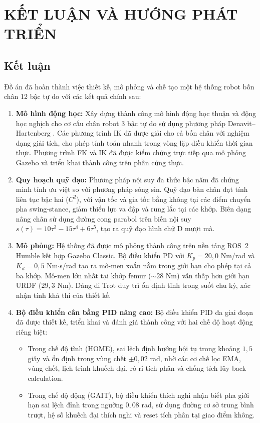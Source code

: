 \chapter{KẾT LUẬN VÀ HƯỚNG PHÁT TRIỂN}

\section{Kết luận}

Đồ án đã hoàn thành việc thiết kế, mô phỏng và chế tạo một hệ thống robot bốn chân 12 bậc tự do với các kết quả chính sau:

\begin{enumerate}
    \item \textbf{Mô hình động học:} Xây dựng thành công mô hình động học thuận và động học nghịch cho cơ cấu chân robot 3 bậc tự do sử dụng phương pháp Denavit--Hartenberg \cite{denavit1955}. Các phương trình IK đã được giải cho cả bốn chân với nghiệm dạng giải tích, cho phép tính toán nhanh trong vòng lặp điều khiển thời gian thực. Phương trình FK và IK đã được kiểm chứng trực tiếp qua mô phỏng Gazebo và triển khai thành công trên phần cứng thực.

    \item \textbf{Quy hoạch quỹ đạo:} Phương pháp nội suy đa thức bậc năm đã chứng minh tính ưu việt so với phương pháp sóng sin. Quỹ đạo bàn chân đạt tính liên tục bậc hai ($C^2$), với vận tốc và gia tốc bằng không tại các điểm chuyển pha swing-stance, giảm thiểu lực va đập và rung lắc tại các khớp. Biên dạng nâng chân sử dụng đường cong parabol trên biến nội suy $s(\tau) = 10\tau^3 - 15\tau^4 + 6\tau^5$, tạo ra quỹ đạo hình chữ D mượt mà.

    \item \textbf{Mô phỏng:} Hệ thống đã được mô phỏng thành công trên nền tảng ROS~2 Humble kết hợp Gazebo Classic. Bộ điều khiển PD với $K_p = 20{,}0$ Nm/rad và $K_d = 0{,}5$ Nm$\cdot$s/rad tạo ra mô-men xoắn nằm trong giới hạn cho phép tại cả ba khớp. Mô-men lớn nhất tại khớp femur ($\sim 28$ Nm) vẫn thấp hơn giới hạn URDF ($29{,}3$ Nm). Dáng đi Trot duy trì ổn định tĩnh trong suốt chu kỳ, xác nhận tính khả thi của thiết kế.

    \item \textbf{Bộ điều khiển cân bằng PID nâng cao:} Bộ điều khiển PID đa giai đoạn đã được thiết kế, triển khai và đánh giá thành công với hai chế độ hoạt động riêng biệt:
    \begin{itemize}
        \item Trong chế độ tĩnh (HOME), sai lệch định hướng hội tụ trong khoảng $1{,}5$ giây và ổn định trong vùng chết $\pm 0{,}02$ rad, nhờ các cơ chế lọc EMA, vùng chết, lịch trình khuếch đại, rò rỉ tích phân và chống tích lũy back-calculation.
        \item Trong chế độ động (GAIT), bộ điều khiển thích nghi nhận biết pha giới hạn sai lệch đỉnh trong ngưỡng $0{,}08$ rad, sử dụng đường cơ sở trung bình trượt, hệ số khuếch đại thích nghi và reset tích phân tại giao điểm không.
    \end{itemize}


\end{enumerate}
